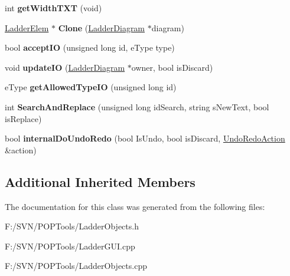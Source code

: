 \begin{DoxyCompactItemize}
\item 
\hypertarget{class_ladder_elem_x_a545b95621f51fd75c2df5f8d7d0293a3}{int {\bfseries get\-Width\-T\-X\-T} (void)}\label{class_ladder_elem_x_a545b95621f51fd75c2df5f8d7d0293a3}

\item 
\hypertarget{class_ladder_elem_x_a543923c0ff29f8ccb1dde76e8665cb1c}{\hyperlink{class_ladder_elem}{Ladder\-Elem} $\ast$ {\bfseries Clone} (\hyperlink{class_ladder_diagram}{Ladder\-Diagram} $\ast$diagram)}\label{class_ladder_elem_x_a543923c0ff29f8ccb1dde76e8665cb1c}

\item 
\hypertarget{class_ladder_elem_x_a7f2294914e3348c6615dea8f23a10c7d}{bool {\bfseries accept\-I\-O} (unsigned long id, e\-Type type)}\label{class_ladder_elem_x_a7f2294914e3348c6615dea8f23a10c7d}

\item 
\hypertarget{class_ladder_elem_x_a40965643c88b60082ec5ad9f890a3b20}{void {\bfseries update\-I\-O} (\hyperlink{class_ladder_diagram}{Ladder\-Diagram} $\ast$owner, bool is\-Discard)}\label{class_ladder_elem_x_a40965643c88b60082ec5ad9f890a3b20}

\item 
\hypertarget{class_ladder_elem_x_a57a585b65c60d6ad25e42d71f2b188d8}{e\-Type {\bfseries get\-Allowed\-Type\-I\-O} (unsigned long id)}\label{class_ladder_elem_x_a57a585b65c60d6ad25e42d71f2b188d8}

\item 
\hypertarget{class_ladder_elem_x_a0d68df2f5a0ed16f12b658f97c815b8f}{int {\bfseries Search\-And\-Replace} (unsigned long id\-Search, string s\-New\-Text, bool is\-Replace)}\label{class_ladder_elem_x_a0d68df2f5a0ed16f12b658f97c815b8f}

\item 
\hypertarget{class_ladder_elem_x_a288f2dd6f82e09798266d851fee3a446}{bool {\bfseries internal\-Do\-Undo\-Redo} (bool Is\-Undo, bool is\-Discard, \hyperlink{struct_undo_redo_action}{Undo\-Redo\-Action} \&action)}\label{class_ladder_elem_x_a288f2dd6f82e09798266d851fee3a446}

\end{DoxyCompactItemize}
\subsection*{Additional Inherited Members}


The documentation for this class was generated from the following files\-:\begin{DoxyCompactItemize}
\item 
F\-:/\-S\-V\-N/\-P\-O\-P\-Tools/Ladder\-Objects.\-h\item 
F\-:/\-S\-V\-N/\-P\-O\-P\-Tools/Ladder\-G\-U\-I.\-cpp\item 
F\-:/\-S\-V\-N/\-P\-O\-P\-Tools/Ladder\-Objects.\-cpp\end{DoxyCompactItemize}
